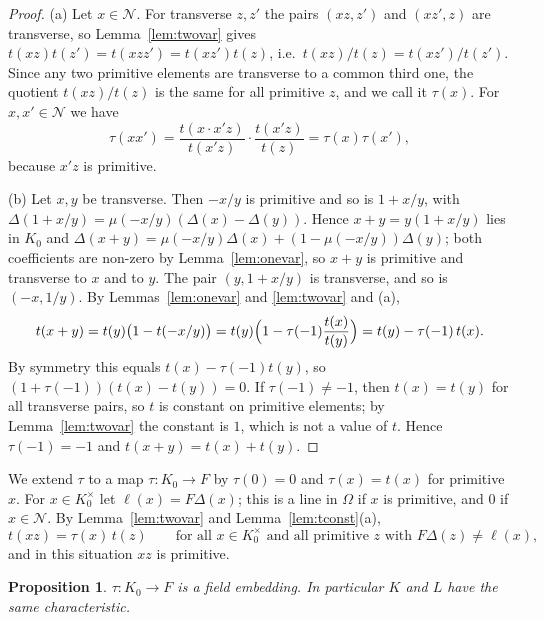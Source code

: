 \documentclass[11pt]{amsart}
\newtheorem{proposition}[theorem]{Proposition}
\theoremstyle{definition}
\theoremstyle{remark}
\begin{document}
\begin{proof}
(a) Let $x\in\mathcal N$. For transverse $z,z'$ the pairs $(xz,z')$ and $(xz',z)$ are transverse, so Lemma~\ref{lem:twovar} gives $t(xz)t(z')=t(xzz')=t(xz')t(z)$, i.e.\ $t(xz)/t(z)=t(xz')/t(z')$.
Since any two primitive elements are transverse to a common third one, the quotient $t(xz)/t(z)$ is the same for all primitive $z$, and we call it $\tau(x)$.
For $x,x'\in\mathcal N$ we have
\[ \tau(xx')=\frac{t(x\cdot x'z)}{t(x'z)}\cdot\frac{t(x'z)}{t(z)}=\tau(x)\tau(x'), \]
because $x'z$ is primitive.

(b) Let $x,y$ be transverse. Then $-x/y$ is primitive and so is $1+x/y$, with $\Delta(1+x/y)=\mu(-x/y)(\Delta(x)-\Delta(y))$. Hence $x+y=y(1+x/y)$ lies in $K_0$ and
$\Delta(x+y)=\mu(-x/y)\Delta(x)+(1-\mu(-x/y))\Delta(y)$; both coefficients are non-zero by Lemma~\ref{lem:onevar}, so $x+y$ is primitive and transverse to $x$ and to $y$.
The pair $(y,1+x/y)$ is transverse, and so is $(-x,1/y)$. By Lemmas~\ref{lem:onevar} and \ref{lem:twovar} and (a),
\[ t(x+y)=t(y)\bigl(1-t(-x/y)\bigr)=t(y)\Bigl(1-\tau(-1)\frac{t(x)}{t(y)}\Bigr)=t(y)-\tau(-1)\,t(x). \]
By symmetry this equals $t(x)-\tau(-1)t(y)$, so $(1+\tau(-1))(t(x)-t(y))=0$. If $\tau(-1)\ne-1$, then $t(x)=t(y)$ for all transverse pairs, so $t$ is constant on primitive elements; by Lemma~\ref{lem:twovar} the constant is $1$, which is not a value of $t$.
Hence $\tau(-1)=-1$ and $t(x+y)=t(x)+t(y)$.
\end{proof}

We extend $\tau$ to a map $\tau\colon K_0\to F$ by $\tau(0)=0$ and $\tau(x)=t(x)$ for primitive $x$. For $x\in K_0^\times$ let $\ell(x)=F\Delta(x)$; this is a line in $\Omega$ if $x$ is primitive, and $0$ if $x\in\mathcal N$.
By Lemma~\ref{lem:twovar} and Lemma~\ref{lem:tconst}(a),
\begin{equation}\label{eq:P3}
t(xz)=\tau(x)\,t(z)\qquad\text{for all $x\in K_0^\times$ and all primitive $z$ with }F\Delta(z)\neq\ell(x),
\end{equation}
and in this situation $xz$ is primitive.

\begin{proposition}\label{prop:tau}
$\tau\colon K_0\to F$ is a field embedding. In particular $K$ and $L$ have the same characteristic.
\end{proposition}
\end{document}
